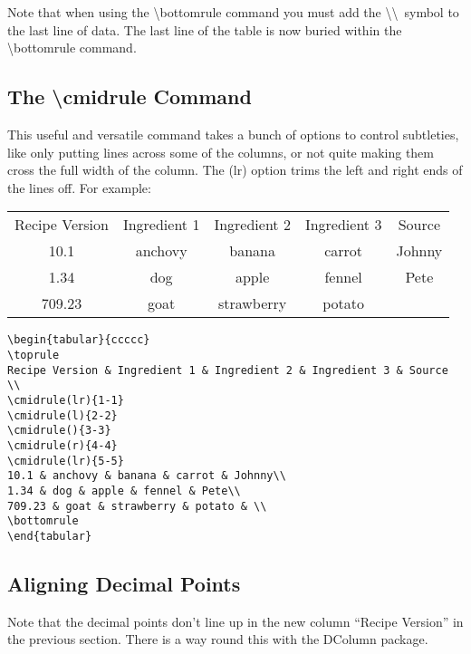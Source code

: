 Note that when using the {\textbackslash}bottomrule command you must add the \textbackslash\textbackslash ~symbol to the last line of data.  The last line of the table is now buried within the {\textbackslash}bottomrule command.

\pagebreak
\subsection{The {\textbackslash}cmidrule Command}
This useful and versatile command takes a bunch of options to control subtleties, like only putting lines across some of the columns, or not quite making them cross the full width of the column. The (lr) option trims the left and right ends of the lines off. For example:

\begin{center}
\begin{tabular}{ccccc}
\toprule
Recipe Version & Ingredient 1 & Ingredient 2 & Ingredient 3 & Source \\
\cmidrule(lr){1-1}
\cmidrule(l){2-2}
\cmidrule(){3-3}
\cmidrule(r){4-4}
\cmidrule(lr){5-5}
10.1 & anchovy & banana & carrot & Johnny\\
1.34 & dog & apple & fennel & Pete\\
709.23 & goat & strawberry & potato & \\
\bottomrule
\end{tabular}

\vspace*{2ex}

\begin{verbatim}
\begin{tabular}{ccccc}
\toprule
Recipe Version & Ingredient 1 & Ingredient 2 & Ingredient 3 & Source \\
\cmidrule(lr){1-1}
\cmidrule(l){2-2}
\cmidrule(){3-3}
\cmidrule(r){4-4}
\cmidrule(lr){5-5}
10.1 & anchovy & banana & carrot & Johnny\\
1.34 & dog & apple & fennel & Pete\\
709.23 & goat & strawberry & potato & \\
\bottomrule
\end{tabular}
\end{verbatim}
\end{center}

\pagebreak
\subsection{Aligning Decimal Points}
Note that the decimal points don't line up in the new column ``Recipe Version'' in the previous section. There is a way round this with the DColumn package.

